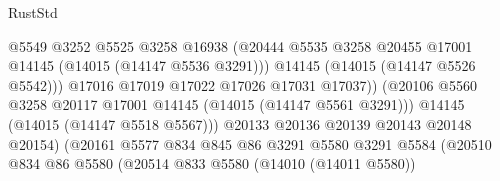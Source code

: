 \begin{lexlean}{RustStd}
\begin{coremodule}
                                              @5549
                                              @3252
                                              @5525
                                              @3258
                                              @16938
                                              (@20444
                                                @5535
                                                @3258
                                                @20455
                                                @17001
                                                @14145
                                                (@14015 (@14147 @5536 @3291)))
                                              @14145
                                              (@14015 (@14147 @5526 @5542)))
                                            @17016
                                            @17019
                                            @17022
                                            @17026
                                            @17031
                                            @17037))
                                        (@20106
                                          @5560
                                          @3258
                                          @20117
                                          @17001
                                          @14145
                                          (@14015 (@14147 @5561 @3291)))
                                        @14145
                                        (@14015 (@14147 @5518 @5567)))
                                      @20133
                                      @20136
                                      @20139
                                      @20143
                                      @20148
                                      @20154)
                                    (@20161
                                      @5577
                                      @834
                                      @845
                                      @86
                                      @3291
                                      @5580
                                      @3291
                                      @5584
                                      (@20510
                                        @834
                                        @86
                                        @5580
                                        (@20514
                                          @833
                                          @5580
                                          (@14010 (@14011 @5580))

\end{coremodule}
\end{lexlean}
